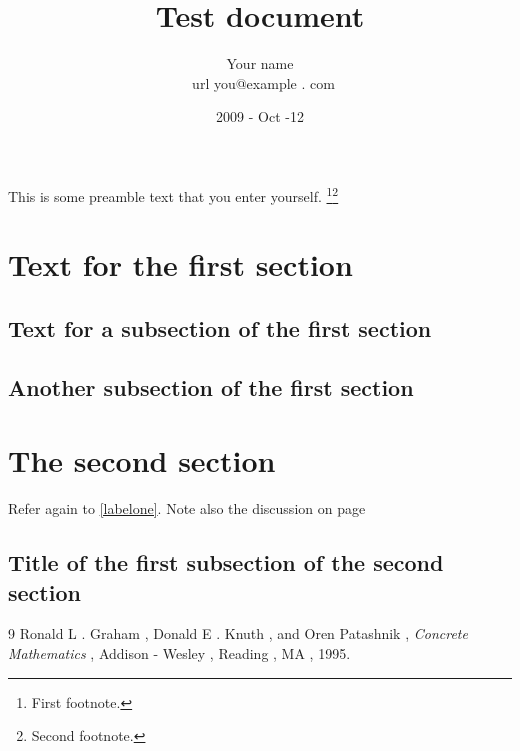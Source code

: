 \documentclass{article}
\title { Test document }
\author { Your name \\ \ url { you@example . com }}
\date{2009 - Oct -12}
\begin{document}
\maketitle
\tableofcontents
\newpage


This is some preamble text that you enter yourself. \footnote{First footnote.}\footnote{Second footnote.}

%
\section { Text for the first section }
\lipsum [1]

\subsection { Text for a subsection of the first section }
\lipsum [2 -3]
\label{labelone}

\subsection { Another subsection of the first section }
\lipsum [4 -5]
\label{labeltwo}

\section { The second section }
\lipsum [6]

Refer again to \ref{labelone}. 
\cite{foo1999}
Note also the discussion on page \pageref{labeltwo}

\subsection { Title of the first subsection of the second section }

\lipsum [7]

\begin { thebibliography }{9}
Ronald L . Graham , Donald E . Knuth , and Oren Patashnik ,
\textit { Concrete Mathematics } ,
Addison - Wesley , Reading , MA , 1995.
\end { thebibliography }
\end{document}
